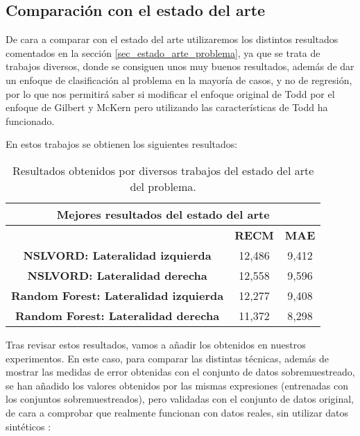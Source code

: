 \subsection{Comparación con el estado del arte}

De cara a comparar con el estado del arte utilizaremos los distintos resultados comentados en la sección \ref{sec_estado_arte_problema}, ya que se trata de trabajos diversos, donde se consiguen unos muy buenos resultados, además de dar un enfoque de clasificación al problema en la mayoría de casos, y no de regresión, por lo que nos permitirá saber si modificar el enfoque original de Todd por el enfoque de Gilbert y McKern pero utilizando las características de Todd ha funcionado.

En estos trabajos se obtienen los siguientes resultados:

\begin{table}[H]
\centering
\begin{tabular}{|c|c|c|}
\hline
\multicolumn{3}{|c|}{\textbf{Mejores resultados del estado del arte}}        \\ \hline
\textbf{}                                     & \textbf{RECM} & \textbf{MAE} \\ \hline
\textbf{NSLVORD: Lateralidad izquierda}       & 12,486        & 9,412        \\ \hline
\textbf{NSLVORD: Lateralidad derecha}         & 12,558        & 9,596        \\ \hline
\textbf{Random Forest: Lateralidad izquierda} & 12,277        & 9,408        \\ \hline
\textbf{Random Forest: Lateralidad derecha}   & 11,372        & 8,298        \\ \hline
\end{tabular}%
\caption{Resultados obtenidos por diversos trabajos del estado del arte del problema.}\label{table:resultados_estado_arte}
\end{table}


Tras revisar estos resultados, vamos a añadir los obtenidos en nuestros experimentos. En este caso, para comparar las distintas técnicas, además de mostrar las medidas de error obtenidas con el conjunto de datos sobremuestreado, se han añadido los valores obtenidos por las mismas expresiones (entrenadas con los conjuntos sobremuestreados), pero validadas con el conjunto de datos original, de cara a comprobar que realmente funcionan con datos reales, sin utilizar datos sintéticos :


